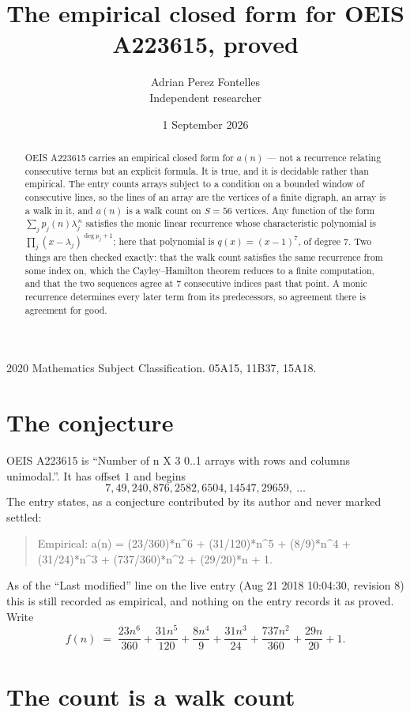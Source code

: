 \documentclass[11pt,a4paper]{article}
\title{The empirical closed form for OEIS A223615, proved}
\author{Adrian Perez Fontelles\\ \small Independent researcher}
\date{1 September 2026}
\theoremstyle{plain}
\theoremstyle{definition}
\begin{document}
\maketitle

\begin{abstract}
OEIS A223615 carries an empirical closed form for $a(n)$ --- not a recurrence relating
consecutive terms but an explicit formula. It is true, and it is decidable rather than
empirical. The entry counts arrays subject to a condition on a bounded window of consecutive lines, so the lines of an array are the
vertices of a finite digraph, an array is a walk in it, and $a(n)$ is a walk count on
$S=56$ vertices. Any function of the form $\sum_j p_j(n)\lambda_j^{\,n}$ satisfies the
monic linear recurrence whose characteristic polynomial is
$\prod_j(x-\lambda_j)^{\deg p_j+1}$; here that polynomial is $q(x)=(x-1)^{7}$, of degree
$7$. Two things are then checked exactly: that the walk count satisfies the same
recurrence from some index on, which the Cayley--Hamilton theorem reduces to a finite
computation, and that the two sequences agree at $7$ consecutive indices past that
point. A monic recurrence determines every later term from its predecessors, so agreement
there is agreement for good.
\end{abstract}

\noindent\small 2020 Mathematics Subject Classification. 05A15, 11B37, 15A18.\normalsize

\section{The conjecture}

OEIS A223615 is ``Number of n X 3 0..1 arrays with rows and columns unimodal.''. It has offset $1$ and begins
\[
7, 49, 240, 876, 2582, 6504, 14547, 29659,\ \dots
\]
The entry states, as a conjecture contributed by its author and never marked settled:
\begin{quote}
Empirical: a(n) = (23/360)*n\^{}6 + (31/120)*n\^{}5 + (8/9)*n\^{}4 + (31/24)*n\^{}3 + (737/360)*n\^{}2 + (29/20)*n + 1.
\end{quote}
As of the ``Last modified'' line on the live entry (Aug 21 2018 10:04:30, revision 8) this is still
recorded as empirical, and nothing on the entry records it as proved. Write
\[
f(n)\;=\;\frac{23 n^{6}}{360} + \frac{31 n^{5}}{120} + \frac{8 n^{4}}{9} + \frac{31 n^{3}}{24} + \frac{737 n^{2}}{360} + \frac{29 n}{20} + 1.
\]

\section{The count is a walk count}
\end{document}
